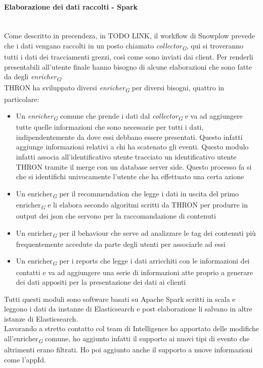 \documentclass[a4paper, 12pt, twoside, openright]{book}
\newcommand{\gloss}[1]{#1\textsubscript{\textit{\tiny{G}}}}
\begin{document}
\paragraph{Elaborazione dei dati raccolti - Spark}\mbox{} \\
Come descritto in precendeza, in TODO LINK, il workflow di Snowplow prevede che i dati vengano raccolti in un posto chiamato \textit{\gloss{collector}}, qui si troveranno tutti i dati dei tracciamenti grezzi, così come sono inviati dai client. Per renderli presentabili all'utente finale hanno bisogno di alcune elaborazioni che sono fatte da degli \textit{\gloss{enricher}}.\\ %
THRON ha sviluppato diversi \textit{\gloss{enricher}} per diversi bisogni, quattro in particolare:
\begin{itemize}
	\item Un \textit{\gloss{enricher}} comune che prende i dati dal \textit{\gloss{collector}} e va ad aggiungere tutte quelle informazioni che sono necessarie per tutti i dati, indipendentemente da dove essi debbano essere presentati. Questo infatti aggiunge informazioni relativi a chi ha scatenato gli eventi. Questo modulo infatti associa all'identificativo utente tracciato un identificativo utente THRON tramite il merge con un database server side. Questo processo fa si che si identifichi univocamente l'utente che ha effettuato una certa azione
	\item Un \gloss{enricher} per il recommendation che legge i dati in uscita del primo \gloss{enricher} e li elabora secondo algoritmi scritti da THRON per produrre in output dei json che servono per la raccomandazione di contenuti
	\item Un \gloss{enricher} per il behaviour che serve ad analizzare le tag dei contenuti più frequentemente accedute da parte degli utenti per associarle ad essi
	\item Un \gloss{enricher} per i reports che legge i dati arricchiti con le informazioni dei contatti e va ad aggiungere una serie di informazioni atte proprio a generare dei dati appositi per la presentazione dei dati ai clienti 
\end{itemize}
Tutti questi moduli sono software basati su Apache Spark scritti in scala e leggono i dati da instanze di Elasticsearch e post elaborazione li salvano in altre istanze di Elasticsearch.\\
Lavorando a stretto contatto col team di Intelligence ho apportato delle modifiche all'\gloss{enricher} comune, ho aggiunto infatti il supporto ai nuovi tipi di evento che altrimenti erano filtrati. Ho poi aggiunto anche il supporto a nuove informazioni come l'appId.\\
\end{document}

